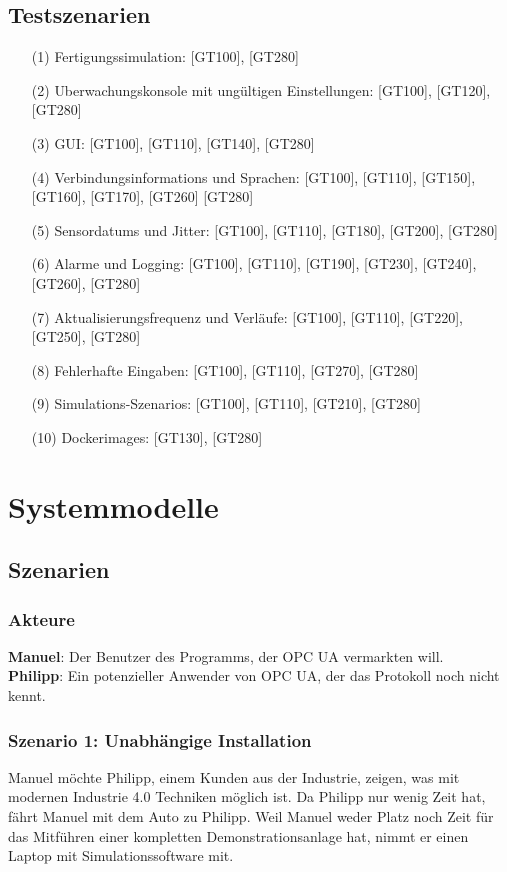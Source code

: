\documentclass[parskip=full]{scrartcl}
\begin{document}
\subsection{Testszenarien}
\begin{enumerate}
  \item[(1)] \gls{Fertigungssimulation}: [GT100], [GT280]
  \item[(2)] \gls{Uberwachungskonsole} mit ungültigen Einstellungen: [GT100], [GT120], [GT280]
  \item[(3)] \gls{GUI}: [GT100], [GT110], [GT140], [GT280]
  \item[(4)] \glspl{Verbindungsinformation} und Sprachen: [GT100], [GT110], [GT150], [GT160], [GT170], [GT260] [GT280]
  \item[(5)] \glspl{Sensordatum} und \gls{Jitter}: [GT100], [GT110], [GT180], [GT200], [GT280]
  \item[(6)] Alarme und Logging: [GT100], [GT110], [GT190], [GT230], [GT240], [GT260], [GT280]
  \item[(7)] Aktualisierungsfrequenz und Verläufe: [GT100], [GT110], [GT220], [GT250], [GT280]
  \item[(8)] Fehlerhafte Eingaben: [GT100], [GT110], [GT270], [GT280]
  \item[(9)] \glspl{Simulations-Szenario}: [GT100], [GT110], [GT210], [GT280]
  \item[(10)] \glspl{Dockerimage}: [GT130], [GT280]
\end{enumerate}

\pagebreak
\section{Systemmodelle}
\subsection{Szenarien}
\subsubsection*{Akteure}
\textbf{Manuel}: Der Benutzer des Programms, der \gls{OPC UA} vermarkten will.\\
\textbf{Philipp}: Ein potenzieller Anwender von \gls{OPC UA}, der das Protokoll noch nicht kennt.

\subsubsection{Szenario 1: Unabhängige Installation}
Manuel möchte Philipp, einem Kunden aus der Industrie, zeigen, was mit modernen Industrie 4.0 Techniken möglich ist.
Da Philipp nur wenig Zeit hat, fährt Manuel mit dem Auto zu Philipp. Weil Manuel weder Platz noch Zeit für das
Mitführen einer kompletten Demonstrationsanlage hat, nimmt er einen Laptop mit Simulationssoftware mit.
\end{document}
